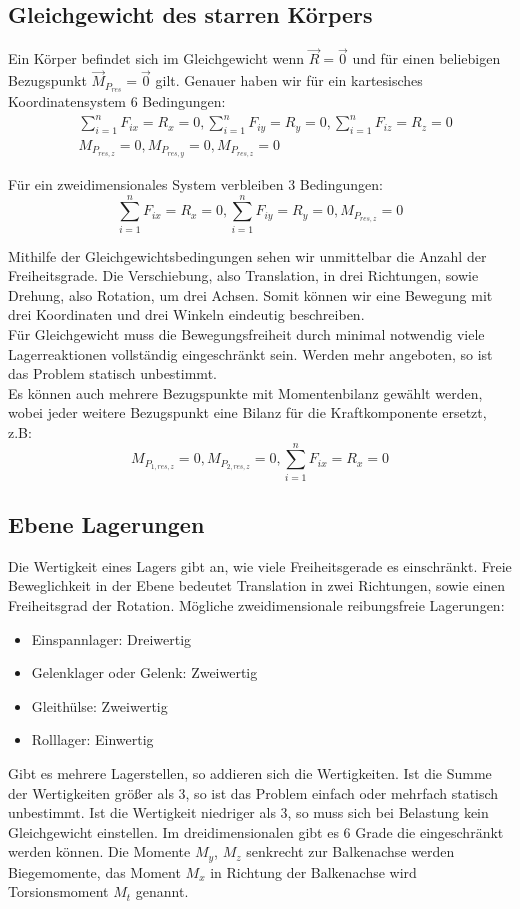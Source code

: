 \documentclass[a4paper,parskip=half*,DIV=7,fontsize=11pt]{scrartcl}
\begin{document}
	\subsection{Gleichgewicht des starren Körpers}
	Ein Körper befindet sich im Gleichgewicht wenn $\overrightarrow{R}=\overrightarrow{0}$ und für einen beliebigen Bezugspunkt $\overrightarrow{M}_{P_{res}}=\overrightarrow{0}$ gilt. Genauer haben wir für ein kartesisches Koordinatensystem 6 Bedingungen:
	\begin{align*}
	& \sum_{i=1}^n F_{ix}=R_x=0,\sum_{i=1}^n F_{iy}=R_y=0,\sum_{i=1}^n F_{iz}=R_z=0 \\
	& M_{P_{res,z}}=0,M_{P_{res,y}}=0,M_{P_{res,z}}=0           
	\end{align*}
	
	Für ein zweidimensionales System verbleiben 3 Bedingungen:
	$$\sum_{i=1}^n F_{ix}=R_x=0,\sum_{i=1}^n F_{iy}=R_y=0,M_{P_{res,z}}=0$$
	
	Mithilfe der Gleichgewichtsbedingungen sehen wir unmittelbar die Anzahl der Freiheitsgrade. Die Verschiebung, also Translation, in drei Richtungen, sowie Drehung, also Rotation, um drei Achsen. Somit können wir eine Bewegung mit drei Koordinaten und drei Winkeln eindeutig beschreiben.\\
	Für Gleichgewicht muss die Bewegungsfreiheit durch minimal notwendig viele Lagerreaktionen vollständig eingeschränkt sein. Werden mehr angeboten, so ist das Problem statisch unbestimmt.\\
	Es können auch mehrere Bezugspunkte mit Momentenbilanz gewählt werden, wobei jeder
	weitere Bezugspunkt eine Bilanz für die Kraftkomponente ersetzt, z.B:
	$$M_{P_{1,res,z}}=0,M_{P_{2,res,z}}=0, \sum_{i=1}^n F_{ix}=R_x=0$$
	
	\subsection{Ebene Lagerungen}
	Die Wertigkeit eines Lagers gibt an, wie viele Freiheitsgerade es einschränkt. Freie Beweglichkeit in der Ebene bedeutet Translation in zwei Richtungen, sowie einen Freiheitsgrad der Rotation. Mögliche zweidimensionale reibungsfreie Lagerungen:
	\begin{itemize}
		\item Einspannlager: Dreiwertig
		\item Gelenklager oder Gelenk: Zweiwertig
		\item Gleithülse: Zweiwertig
		\item Rolllager: Einwertig
	\end{itemize}
	Gibt es mehrere Lagerstellen, so addieren sich die Wertigkeiten. Ist die Summe der
	Wertigkeiten größer als 3, so ist das Problem einfach oder mehrfach statisch unbestimmt. Ist die Wertigkeit niedriger als 3, so muss sich bei Belastung kein Gleichgewicht einstellen. Im dreidimensionalen gibt es 6 Grade die eingeschränkt werden können. Die Momente $M_y$, $M_z$ senkrecht zur Balkenachse werden Biegemomente, das Moment $M_x$ in Richtung der Balkenachse wird Torsionsmoment $M_t$ genannt.
	
\end{document}
